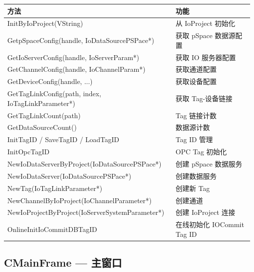 \documentclass[12pt,a4paper]{ctexart}
\begin{document}
\begin{table}[H]\centering
\begin{tabular}{lp{7cm}}
\toprule
\textbf{方法} & \textbf{功能} \\
\midrule
InitByIoProject(VString) & 从 IoProject 初始化 \\
GetpSpaceConfig(handle, IoDataSourcePSPace*) & 获取 pSpace 数据源配置 \\
GetIoServerConfig(handle, IoServerParam*) & 获取 IO 服务器配置 \\
GetChannelConfig(handle, IoChannelParam*) & 获取通道配置 \\
GetDeviceConfig(handle, ...) & 获取设备配置 \\
GetTagLinkConfig(path, index, IoTagLinkParameter*) & 获取 Tag-设备链接 \\
GetTagLinkCount(path) & Tag 链接计数 \\
GetDataSourceCount() & 数据源计数 \\
InitTagID / SaveTagID / LoadTagID & Tag ID 管理 \\
InitOpcTagID & OPC Tag 初始化 \\
NewIoDataServerByProject(IoDataSourcePSPace*) & 创建 pSpace 数据服务 \\
NewIoDataServer(IoDataSourcePSPace*) & 创建数据服务 \\
NewTag(IoTagLinkParameter*) & 创建新 Tag \\
NewChannelByIoProject(IoChannelParameter*) & 创建通道 \\
NewIoProjectByProject(IoServerSystemParameter*) & 创建 IoProject 连接 \\
OnlineInitIoCommitDBTagID & 在线初始化 IOCommit Tag ID \\
\bottomrule
\end{tabular}
\end{table}

\subsection{CMainFrame — 主窗口}
\end{document}
